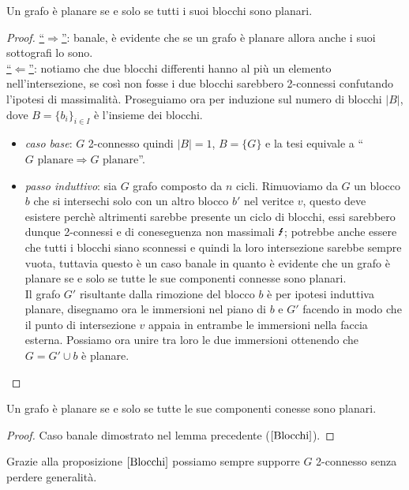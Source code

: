 \begin{proposizione}\label{Blocchi}
    Un grafo è planare se e solo se tutti i suoi blocchi sono planari.
    \begin{proof}
        \underline{“\(\Rightarrow\)”}: banale, è evidente che se un grafo è planare allora anche i suoi sottografi lo sono.\\
        \underline{“\(\Leftarrow\)”}: notiamo che due blocchi differenti hanno al più un elemento nell'intersezione, se così non fosse i due blocchi sarebbero 2-connessi confutando l'ipotesi di massimalità. Proseguiamo ora per induzione sul numero di blocchi \(|B|\), dove \(B={\{b_i\}}_{i \in I}\) è l'insieme dei blocchi.
        \begin{itemize}
            \item \textit{caso base}: \(G\) 2-connesso quindi \(|B|=1\), \(B=\{G\}\) e la tesi equivale a “\(G \text{ planare} \Rightarrow G \text{ planare}\)”.
            \item \textit{passo induttivo}: sia \(G\) grafo composto da \(n\) cicli. Rimuoviamo da \(G\) un blocco \(b\) che si intersechi solo con un altro blocco \(b'\) nel veritce \(v\), questo deve esistere perchè altrimenti sarebbe presente un ciclo di blocchi, essi sarebbero dunque 2-connessi e di coneseguenza non massimali \(\text{\Lightning}\); 
            potrebbe anche essere che tutti i blocchi siano sconnessi e quindi la loro intersezione sarebbe sempre vuota, tuttavia questo è un caso banale in quanto è evidente che un grafo è planare se e solo se tutte le sue componenti connesse sono planari. 
            \\ Il grafo \(G'\) risultante dalla rimozione del blocco \(b\) è per ipotesi induttiva planare, disegnamo ora le immersioni nel piano di \(b\) e \(G'\) facendo in modo che il punto di intersezione \(v\) appaia in entrambe le immersioni nella faccia esterna. Possiamo ora unire tra loro le due immersioni ottenendo che \(G=G' \cup b\) è planare.
        \end{itemize}
    \end{proof}
\end{proposizione}
\begin{lemma}
    Un grafo è planare se e solo se tutte le sue componenti conesse sono planari.
    \begin{proof}
        Caso banale dimostrato nel lemma precedente (\(\ref{Blocchi}\)).
    \end{proof}
\end{lemma}
Grazie alla proposizione \(\ref{Blocchi}\) possiamo sempre supporre \(G\) 2-connesso senza perdere generalità.
